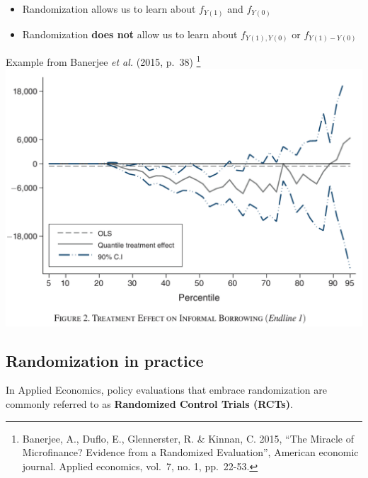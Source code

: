\documentclass[
  letterpaper,
  DIV=11,
  numbers=noendperiod]{scrreprt}
\providecommand{\tightlist}{%
  \setlength{\itemsep}{0pt}\setlength{\parskip}{0pt}}\usepackage{longtable,booktabs,array}
\theoremstyle{definition}
\theoremstyle{remark}
\begin{document}
\begin{itemize}
\tightlist
\item
  Randomization allows us to learn about \(f_{Y(1)}\) and \(f_{Y(0)}\)
\item
  Randomization \textbf{does not} allow us to learn about
  \(f_{Y(1),Y(0)}\) or \(f_{Y(1)-Y(0)}\)
\end{itemize}

Example from Banerjee \emph{et al.} (2015, p.~38) \footnote{Banerjee,
  A., Duflo, E., Glennerster, R. \& Kinnan, C. 2015, ``The Miracle of
  Microfinance? Evidence from a Randomized Evaluation'', American
  economic journal. Applied economics, vol.~7, no. 1, pp.~22-53.}
\includegraphics{Images/Banerjee_p38.png}

\hypertarget{randomization-in-practice}{%
\subsection{Randomization in practice}\label{randomization-in-practice}}

In Applied Economics, policy evaluations that embrace randomization are
commonly referred to as \textbf{Randomized Control Trials (RCTs)}.

\par
\end{document}

